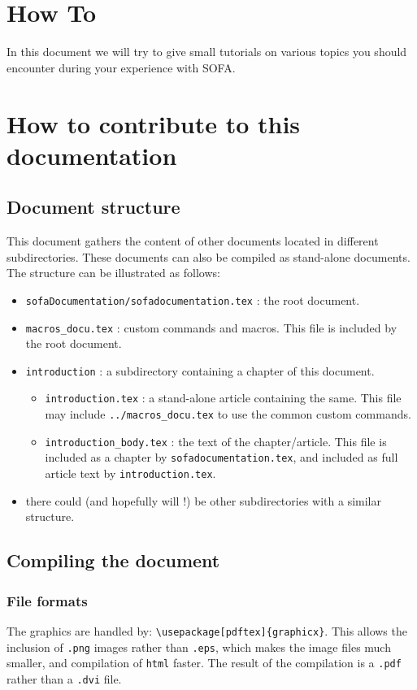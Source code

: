 \documentclass[a4paper,10pt]{report}
\begin{document}
\chapter{How To}
\graphicspath{{../HowTo/}}  %
In this document we will try to give small tutorials on various topics you should encounter during your experience with SOFA.




\chapter{How to contribute to this documentation}
\section{Document structure}
This document gathers the content of other documents located in different subdirectories. These documents can also be compiled as stand-alone documents.
The structure can be illustrated as follows:
\begin{itemize}
 \item \texttt{sofaDocumentation/sofadocumentation.tex} : the root document.
 \item \texttt{macros\_docu.tex} : custom commands and macros. This file is included by the root document.
 \item \texttt{introduction} : a subdirectory containing a chapter of this document.
\begin{itemize}
 \item \texttt{introduction.tex} : a stand-alone article containing the same. This file may include \texttt{../macros\_docu.tex} to use the common custom commands.
 \item \texttt{introduction\_body.tex} : the text of the chapter/article. This file is included as a chapter by \texttt{sofadocumentation.tex}, and included as full article text by \texttt{introduction.tex}.
\end{itemize}
 \item there could (and hopefully will !) be other subdirectories with a similar structure.
\end{itemize}

\section{Compiling the document}
\subsection{File formats}
The graphics are handled by: \texttt{\textbackslash usepackage[pdftex]\{graphicx\}}. This allows the inclusion of \texttt{.png} images rather than \texttt{.eps}, which makes the image files much smaller, and compilation of \texttt{html} faster. The result of the compilation is a \texttt{.pdf} rather than a \texttt{.dvi} file.
\end{document}
